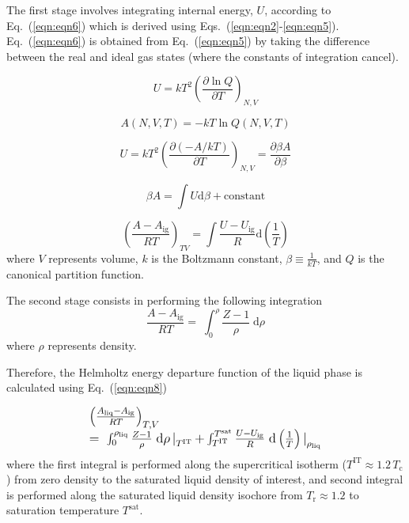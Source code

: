 \documentclass[5p,times]{elsarticle}
\begin{document}
The first stage involves integrating internal energy, $U$, according to Eq.~(\ref{eqn:eqn6}) which is derived using Eqs.~(\ref{eqn:eqn2}-\ref{eqn:eqn5}). Eq.~(\ref{eqn:eqn6}) is obtained from Eq.~(\ref{eqn:eqn5}) by taking the difference between the real and ideal gas states (where the constants of integration cancel). 

\begin{equation}
U=kT^{2} \left( \frac{\partial \ln Q}{\partial T}\right) _{N,V}  \label{eqn:eqn2}
\end{equation}

\begin{equation}
A \left( N,V,T \right)=-kT \ln Q\left(N,V,T\right)
\label{eqn:eqn3}
\end{equation}

\begin{equation}
U=kT^{2} \left( \frac{\partial (-A/kT)}{\partial T} \right)_{N,V} =\frac{\partial \beta A}{\partial \beta }  \label{eqn:eqn4}
\end{equation}

\begin{equation}
\beta A=\int U\mathrm{d} \beta + \mathrm{constant}  \label{eqn:eqn5}
\end{equation}

\begin{equation}
 \left(\frac{ A-A_\mathrm{ig} }{RT}\right)_{TV} =\int \frac{U-U_\mathrm{ig}}{R} \mathrm{d}\left( \frac{1}{T} \right) \label{eqn:eqn6}
\end{equation}
where $V$ represents volume,  $k$ is the Boltzmann constant, $\beta \equiv \frac{1}{kT}$, and $Q$ is the canonical partition function.


The second stage consists in performing the following integration
\begin{equation}
\frac{A-A_\mathrm{ig}}{RT} =\; \int _{0}^{\rho }\frac{Z-1}{\rho } \; \mathrm{d}\rho \label{eqn:eqn7}
\end{equation}
where $\rho$ represents density.

Therefore, the Helmholtz energy departure function of the liquid phase is calculated using Eq.~(\ref{eqn:eqn8})

\begin{equation}
\begingroup
\large
\begin{array}{l}
\left( \frac{A_\mathrm{liq} -A_\mathrm{ig} }{RT} \right)_{T,V}
\\ 
{=\; \int _{0}^{\rho _{\mathrm{liq}} }\frac{Z-1}{\rho } \; \mathrm{d}\rho \mathop{|}\nolimits_{T^{\mathrm{IT}}} +\int _{T^{\mathrm{IT}}}^{T^{\mathrm{\mathrm{sat}}}
} \frac{U-U_\mathrm{ig}}{R} \; \mathrm{d} \left(\frac{1}{T} \right) \mathop{|}\nolimits_{\rho _{\mathrm{liq}}}}  
\end{array} 
\endgroup
\label{eqn:eqn8}
\end{equation}
where the first integral is performed along the supercritical isotherm ($T^{\mathrm{IT}} \approx 1.2\,T_\mathrm{c}$) from zero density to the saturated liquid density of interest, and second integral is performed along the saturated liquid density isochore from $T_\mathrm{r} \approx 1.2$ to saturation temperature $T^\mathrm{sat}$.
\end{document}
